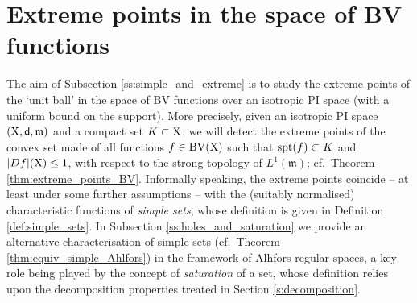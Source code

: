 \documentclass[reqno]{amsart}
\numberwithin{equation}{section}
\newcommand{\X}{{\rm X}}
\newcommand{\sfd}{{\sf d}}
\newcommand{\mm}{\mathfrak m}
\newcommand{\1}{\mathbbm 1}
\newcommand{\BV}{{\rm BV}}
\begin{document}
\section{Extreme points in the space of BV functions}\label{s:extreme_BV}
%
%
The aim of Subsection \ref{ss:simple_and_extreme} is to study the extreme
points of the `unit ball' in the space of BV functions over an isotropic
PI space (with a uniform bound on the support). More precisely, given an
isotropic PI space \((\X,\sfd,\mm)\) and a compact set \(K\subset\X\), we will detect
the extreme points of the convex set made of all functions \(f\in\BV(\X)\)
such that \({\rm spt}(f)\subset K\) and \(|Df|(\X)\leq 1\), with respect
to the strong topology of \(L^1(\mm)\); cf.\ Theorem \ref{thm:extreme_points_BV}.
Informally speaking, the extreme points coincide -- at least under some further
assumptions -- with the (suitably normalised) characteristic functions of
\emph{simple sets}, whose definition is given in Definition \ref{def:simple_sets}.
In Subsection \ref{ss:holes_and_saturation} we provide an alternative
characterisation of simple sets (cf.\ Theorem \ref{thm:equiv_simple_Ahlfors})
in the framework of Alhfors-regular spaces, a key role being played by the
concept of \emph{saturation} of a set, whose definition relies upon the
decomposition properties treated in Section \ref{s:decomposition}.
%
%
\end{document}
